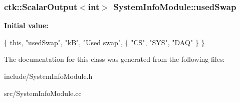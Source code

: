 \subsubsection[{\texorpdfstring{used\+Swap}{usedSwap}}]{\setlength{\rightskip}{0pt plus 5cm}ctk\+::\+Scalar\+Output$<$int$>$ System\+Info\+Module\+::used\+Swap}\hypertarget{classSystemInfoModule_a9191ec838fbf10a38023ea6ecbf1386d}{}\label{classSystemInfoModule_a9191ec838fbf10a38023ea6ecbf1386d}
{\bfseries Initial value\+:}
\begin{DoxyCode}
\{ \textcolor{keyword}{this}, \textcolor{stringliteral}{"usedSwap"}, \textcolor{stringliteral}{"kB"}, \textcolor{stringliteral}{"Used swap"},
    \{ \textcolor{stringliteral}{"CS"}, \textcolor{stringliteral}{"SYS"}, \textcolor{stringliteral}{"DAQ"} \} \}
\end{DoxyCode}


The documentation for this class was generated from the following files\+:\begin{DoxyCompactItemize}
\item 
include/System\+Info\+Module.\+h\item 
src/System\+Info\+Module.\+cc\end{DoxyCompactItemize}
